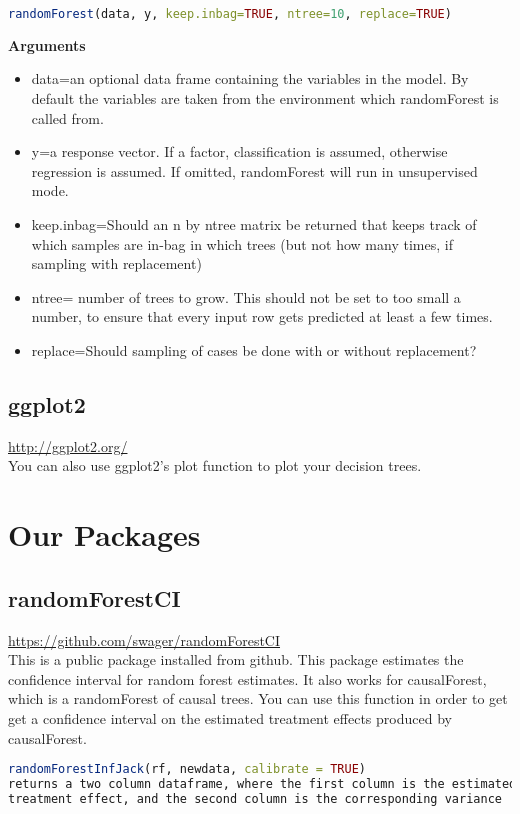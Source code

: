 \documentclass{article}
\begin{document}
\begin{lstlisting}[language=R]
randomForest(data, y, keep.inbag=TRUE, ntree=10, replace=TRUE)
\end{lstlisting}
\textbf{Arguments} \\
\begin{itemize}
  \item data=an optional data frame containing the variables in the model. By default the variables are taken from the environment which randomForest is called from.
  \item y=a response vector. If a factor, classification is assumed, otherwise regression is assumed. If omitted, randomForest will run in unsupervised mode.
  \item keep.inbag=Should an n by ntree matrix be returned that keeps track of which samples are in-bag in which trees (but not how many times, if sampling with replacement)
  \item ntree= number of trees to grow. This should not be set to too small a number, to ensure that every input row gets predicted at least a few times.
  \item replace=Should sampling of cases be done with or without replacement?
\end{itemize}

 \subsection{ggplot2}\url{http://ggplot2.org/}\\
 You can also use ggplot2's plot function to plot your decision trees. 
 \section{Our Packages}
 \subsection{randomForestCI}
 	\url{https://github.com/swager/randomForestCI} \\
This is a public package installed from github. 
This package estimates the confidence interval for random forest estimates. 
It also works for causalForest, which is a randomForest of causal trees. You can use this function in order to get get a confidence interval on the estimated treatment effects produced by causalForest. 
\begin{lstlisting}[language=R]
randomForestInfJack(rf, newdata, calibrate = TRUE)
returns a two column dataframe, where the first column is the estimated 
treatment effect, and the second column is the corresponding variance
\end{lstlisting}
\end{document}

